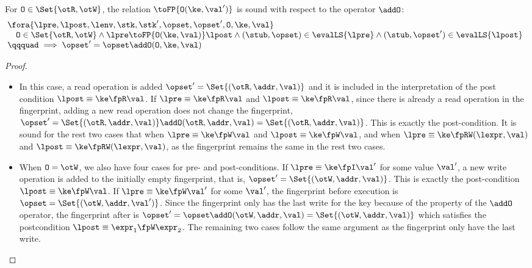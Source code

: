 \begin{lemma}
\label{lem:fingerprint-op}
\label{lem:appendix-fingerprint-op}
For \( \mathtt{O} \in \Set{\otR, \otW} \), the relation \( \toFP{\mathtt{O}(\ke,\val')}\) is sound with respect to the operator \( \addO \):
\[
\begin{array}{@{}l}
    \fora{\lpre, \lpost, \lenv, \stk, \stk', \opset, \opset', \mathtt{O}, \ke, \val} \\
    \quad \mathtt{O} \in \Set{\otR, \otW} 
    \land \lpre \toFP{\mathtt{O}(\ke,\val)} \lpost
    \land (\stub, \opset) \in \evalLS{\lpre}
    \land (\stub, \opset') \in \evalLS{\lpost} \\
    \qqquad \implies \opset' = \opset \addO (\mathtt{O}, \ke, \val)
\end{array}
\]
\end{lemma}
\begin{proof}
\begin{itemize}
    \item In this case, a read operation is added \( \opset' = \Set{(\otR, \addr, \val)} \) and it is included in the interpretation of the post condition \( \lpost \equiv \ke \fpR \val \).
If \( \lpre \equiv \ke \fpR \val \) and \( \lpost \equiv \ke \fpR \val \), 
since there is already a read operation in the fingerprint, adding a new read operation does not change the fingerprint, \ie \( \opset' = \Set{(\otR, \addr, \val)} \addO (\otR, \addr, \val ) = \Set{(\otR, \addr, \val)} \).
This is exactly the post-condition.
It is sound for the rest two cases that  when \( \lpre \equiv \ke \fpW \val \) and \( \lpost \equiv \ke \fpW \val \), and when \( \lpre \equiv \ke \fpRW (\lexpr,\val) \) and \( \lpost \equiv \ke \fpRW (\lexpr,\val) \), as the fingerprint remains the same in the rest two cases.

\item When \( \mathtt{O} = \otW\), we also have four cases for pre- and post-conditions.
If \( \lpre \equiv \ke \fpI \val' \) for some value \( \val' \), a new write operation is added to the initially empty fingerprint, that is, \( \opset' = \Set{(\otW, \addr, \val)}\).
This is exactly the post-condition \( \lpost \equiv \ke \fpW \val \).
If \( \lpre \equiv \ke \fpW \val' \) for some \( \val' \), the fingerprint before execution is \( \opset = \Set{(\otW, \addr, \val')}\).
Since the fingerprint only has the last write for the key because of the property of the \( \addO \) operator,
the fingerprint after is \( \opset' = \opset \addO (\otW, \addr, \val) = \Set{(\otW, \addr, \val)}\) which satisfies the postcondition \( \lpost \equiv \expr_{1} \fpW \expr_{2} \).
The remaining two cases follow the same argument as the fingerprint only have the last write.
\end{itemize}
\end{proof}
